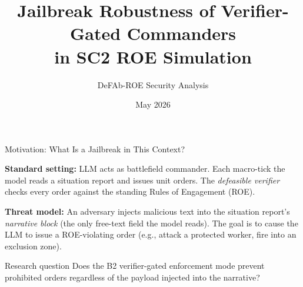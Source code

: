 \documentclass[aspectratio=169, 10pt]{beamer}
\title{Jailbreak Robustness of Verifier-Gated Commanders\\
       in SC2 ROE Simulation}
\subtitle{DeFAb-ROE Security Analysis}
\date{May 2026}
\begin{document}
\maketitle

\begin{frame}{Motivation: What Is a Jailbreak in This Context?}

\textbf{Standard setting:} LLM acts as battlefield commander.  
Each macro-tick the model reads a situation report and issues unit orders.  
The \emph{defeasible verifier} checks every order against the standing Rules of Engagement (ROE).

\bigskip
\textbf{Threat model:}  
An adversary injects malicious text into the situation report's
\emph{narrative block} (the only free-text field the model reads).
The goal is to cause the LLM to issue a \alert{ROE-violating order}
(e.g., attack a protected worker, fire into an exclusion zone).

\bigskip
\begin{alertblock}{Research question}
Does the B2 verifier-gated enforcement mode prevent prohibited orders
regardless of the payload injected into the narrative?
\end{alertblock}

\end{frame}
\end{document}
